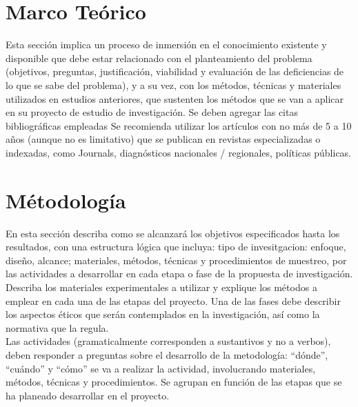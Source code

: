 \documentclass[12pt,a4paper]{article}
\begin{document}
\section{Marco Teórico}
\noindent
Esta sección implica un proceso de inmersión en el
conocimiento existente y disponible que debe estar relacionado con el planteamiento del problema
(objetivos, preguntas, justificación, viabilidad y evaluación de las deficiencias de lo que se sabe del
problema), y a su vez, con los métodos, técnicas y materiales utilizados en
estudios anteriores, que sustenten los métodos que se van a aplicar en su proyecto
de estudio de investigación. Se deben agregar las citas bibliográficas empleadas Se recomienda utilizar los artículos con no más de 5 a 10 años (aunque no es limitativo) que se
publican en revistas especializadas o indexadas, como Journals, diagnósticos
nacionales / regionales, políticas públicas.

\section{Métodología}
\noindent
En esta sección describa como se alcanzará los objetivos especificados hasta los
resultados, con una estructura lógica que incluya: tipo de invesitgacion: enfoque, diseño, alcance; materiales, métodos, técnicas y
procedimientos de muestreo, por las actividades a desarrollar en cada etapa o fase de la propuesta de
investigación. Describa los materiales experimentales a utilizar y explique los métodos a
emplear en cada una de las etapas del proyecto. Una de las fases debe describir los
aspectos éticos que serán contemplados en la investigación, así como la normativa que
la regula.\\

Las actividades (gramaticalmente corresponden a sustantivos y no a verbos), deben
responder a preguntas sobre el desarrollo de la metodología: “dónde”, “cuándo” y “cómo”
se va a realizar la actividad, involucrando materiales, métodos, técnicas y
procedimientos. Se agrupan en función de las etapas que se ha planeado desarrollar en
el proyecto.


\end{document}

